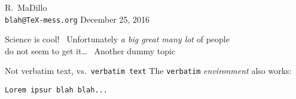 \documentclass[16pt]{projector}
\begin{document}

%
%
\thispagestyle{empty}
\begin{center}
  \vspace*{-0.5em}
	\vfill
	R.\ MaDillo\\
	\texttt{blah@TeX-mess.org}
	\vfill
	December 25, 2016
	\vfill
\end{center}
%
%

\begin{slide}
	\vfill
	\vfill
	{
     Science is cool!~\citep{Sagan}
	}
	\vfill
	{
		\bulletB Unfortunately \emph{a big great many lot} of people\\
    \hspace{1.5em}do not seem to get it\dots~\citep{Feynman74}
  }
	\vfill
	{
		\bulletD Another dummy topic 
	}
	\vfill
\end{slide}
\begin{slide*}
	\vfill
	\bulletB Not verbatim text, vs.\ \verb+verbatim text+
	\vfill
	\bulletB The \verb+verbatim+ \emph{environment} also works:
	\vfill
	\begin{verbatim}
Lorem ipsur blah blah...
	\end{verbatim}
	\vfill
\end{slide*}
\begin{slide}
  \vfill
  
  
  \vfill
\end{slide}
\begin{slide}
	\vfill
	\vfill
\end{slide}
\end{document}
